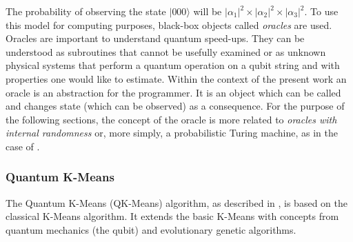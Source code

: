The probability of observing the state $|000 \rangle$ will be $|\alpha_1|^2 \times |\alpha_2|^2 \times |\alpha_3|^2$.
To use this model for computing purposes, black-box objects called \emph{oracles} are used.
Oracles are important to understand quantum speed-ups.
They can be understood as subroutines that cannot be usefully examined or as unknown physical systems that perform a quantum operation on a qubit string \cite{Rosenbaum2011} and with properties one would like to estimate.
Within the context of the present work an oracle is an abstraction for the programmer.
It is an object which can be called and changes state (which can be observed) as a consequence.
For the purpose of the following sections, the concept of the oracle is more related to \emph{oracles with internal randomness} \cite{Rosenbaum2011} or, more simply, a probabilistic Turing machine, as in the case of \cite{hung2013quantum}.



\subsubsection{Quantum K-Means}
\label{sec:qkmeans}





The Quantum K-Means (QK-Means) algorithm, as described in \cite{Casper2012KMeans}, is based on the classical K-Means algorithm.
It extends the basic K-Means with concepts from quantum mechanics (the qubit) and evolutionary genetic algorithms.

